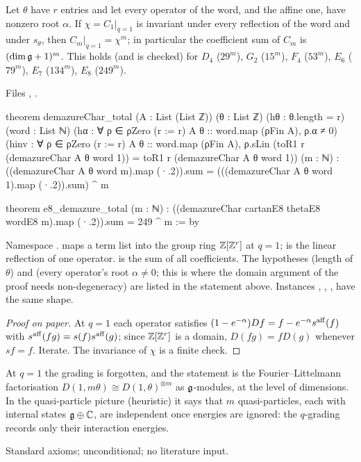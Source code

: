 \begin{theorem}[Tensor factorisation at $q=1$]\label{l25:thm:total}
Let $\theta$ have $r$ entries and let every operator of the word, and the affine one, have nonzero root $\alpha$. If
$\chi=C_1|_{q=1}$ is invariant under every reflection of the word and under $s_\theta$, then
$C_m|_{q=1}=\chi^m$; in particular the coefficient sum of $C_m$ is $(\dim\mathfrak g+1)^m$. This holds (and is checked)
for $D_4$ ($29^m$), $G_2$ ($15^m$), $F_4$ ($53^m$), $E_6$ ($79^m$), $E_7$ ($134^m$), $E_8$ ($249^m$).
\end{theorem}
\noindent Files ,
.
\begin{leancode}
theorem demazureChar_total (A : List (List ℤ)) (θ : List ℤ) (hθ : θ.length = r)
    (word : List ℕ)
    (hα : ∀ ρ ∈ ρZero (r := r) A θ :: word.map (ρFin A), ρ.α ≠ 0)
    (hinv : ∀ ρ ∈ ρZero (r := r) A θ :: word.map (ρFin A),
      ρ.sLin (toR1 r (demazureChar A θ word 1)) = toR1 r (demazureChar A θ word 1)) (m : ℕ) :
    ((demazureChar A θ word m).map (·.2)).sum = (((demazureChar A θ word 1).map (·.2)).sum) ^ m

theorem e8_demazure_total (m : ℕ) :
    ((demazureChar cartanE8 thetaE8 wordE8 m).map (·.2)).sum = 249 ^ m := by
\end{leancode}
\begin{dictionary}
Namespace .  maps a term list into the group ring
${\mathbb{Z}}[{\mathbb{Z}}^r]$ at $q=1$;  is the linear reflection of one operator.  is the sum of all
coefficients. The hypotheses  (length of $\theta$) and  (every operator's root $\alpha\ne0$; this is
where the domain argument of the proof needs non-degeneracy) are listed in the statement above. Instances , , ,
 have the same shape.
\end{dictionary}
\begin{proof}[Proof on paper]
At $q=1$ each operator satisfies $(1-e^{-\alpha})Df=f-e^{-\alpha}s^{\rm aff}(f)$ with $s^{\rm aff}(fg)=s(f)s^{\rm aff}(g)$; since
${\mathbb{Z}}[{\mathbb{Z}}^r]$ is a domain, $D(fg)=fD(g)$ whenever $sf=f$. Iterate. The invariance of $\chi$ is a finite check.
\end{proof}
\begin{physics}
At $q=1$ the grading is forgotten, and the statement is the Fourier--Littelmann factorisation
$D(1,m\theta)\cong D(1,\theta)^{\otimes m}$ as $\mathfrak g$-modules, at the level of dimensions. In the quasi-particle
picture (heuristic) it says that $m$ quasi-particles, each with internal states $\mathfrak g\oplus{\mathbb{C}}$, are
independent once energies are ignored: the $q$-grading records only their interaction energies.
\end{physics}
\begin{status}
Standard axioms; unconditional; no literature input.
\end{status}

